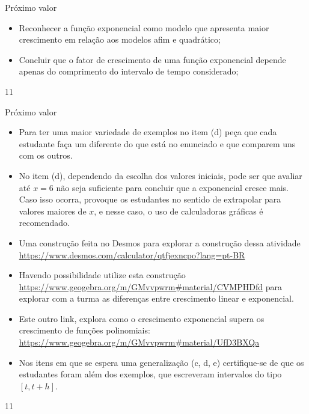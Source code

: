 \def\currentcolor{session3}
\begin{objectives}{Próximo valor}
{
\begin{itemize}
\item Reconhecer a função exponencial como modelo que apresenta maior crescimento em relação aos modelos afim e quadrático;

\end{itemize}

\begin{itemize}
\item Concluir que o fator de crescimento de uma função exponencial depende apenas do comprimento do intervalo de tempo considerado;

\end{itemize}

}{1}{1}
\end{objectives}
\marginpar{\vspace{-2em}}
\begin{sugestions}{Próximo valor}
{
\begin{itemize}
\item Para ter uma maior variedade de exemplos no item (d) peça que cada estudante faça um diferente do que está no enunciado e que comparem uns com os outros.

\item No item (d), dependendo da escolha dos valores iniciais, pode ser que avaliar até $x=6$ não seja suficiente para concluir que a exponencial cresce mais. Caso isso ocorra, provoque os estudantes no sentido de extrapolar para valores maiores de $x$, e nesse caso, o uso de calculadoras gráficas é recomendado.

\item Uma construção feita no Desmos para explorar a construção dessa atividade \url{https://www.desmos.com/calculator/qtfjexncpo?lang=pt-BR}

\item Havendo possibilidade utilize esta construção \url{https://www.geogebra.org/m/GMvvpwrm\#material/CVMPHDfd} para explorar com a turma  as diferenças entre crescimento linear e exponencial.

\item Este outro link, explora como o crescimento exponencial supera os crescimento de funções polinomiais:  \url{https://www.geogebra.org/m/GMvvpwrm\#material/UfD3BXQa}

\end{itemize}


\begin{itemize}
\item Nos itens em que se espera uma generalização (c, d, e) certifique-se de que os estudantes foram além dos exemplos, que escreveram intervalos do tipo $[t,t+h]$.

\end{itemize}
}{1}{1}
\end{sugestions}

